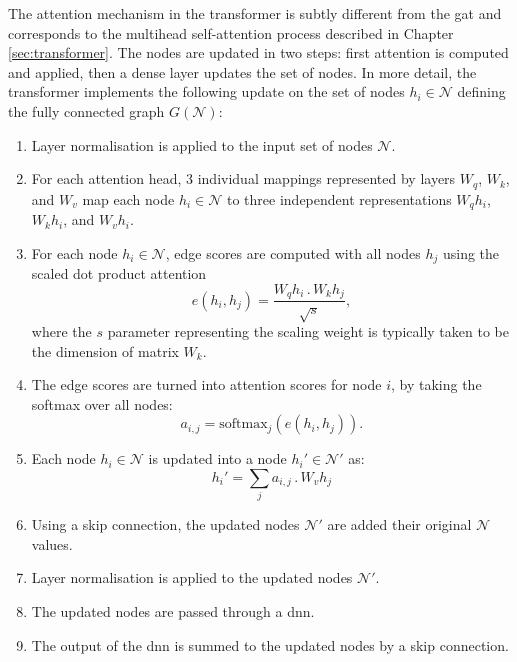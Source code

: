 The attention mechanism in the transformer is subtly different from the \gls{gat} and corresponds to the multihead self-attention process described in Chapter \ref{sec:transformer}. The nodes are updated in two steps: first attention is computed and applied, then a dense layer updates the set of nodes. In more detail, the transformer implements the following update on the set of nodes $h_i \in \mathcal{N}$ defining the fully connected graph $G(\mathcal{N})$:
\begin{enumerate}
  \item Layer normalisation is applied to the input set of nodes $\mathcal{N}$.
  \item For each attention head, 3 individual mappings represented by layers $W_q$, $W_k$, and $W_v$ map each node $h_i \in \mathcal{N}$ to three independent representations $W_qh_i$, $W_kh_i$, and $W_vh_i$.
  \item For each node $h_i \in \mathcal{N}$, edge scores are computed with all nodes $h_j$ using the scaled dot product attention \[e\left(h_i, h_j\right) = \frac{W_q h_i\, . \, W_k h_j}{\sqrt{s}},\] where the $s$ parameter representing the scaling weight is typically taken to be the dimension of matrix $W_k$. 
  \item The edge scores are turned into attention scores for node $i$, by taking the softmax over all nodes: \[a_{i, j} = \textrm{softmax}_j\left(e(h_i, h_j) \right).\]
  \item Each node $h_i \in \mathcal{N}$ is updated into a node $h_i' \in \mathcal{N}'$ as: \[h_i' = \sum_j a_{i, j} \,.\, W_v h_j\]
  \item Using a skip connection, the updated nodes $\mathcal{N}'$ are added their original $\mathcal{N}$ values. 
  \item Layer normalisation is applied to the updated nodes $\mathcal{N}'$.
  \item The updated nodes are passed through a \gls{dnn}.
  \item The output of the \gls{dnn} is summed to the updated nodes by a skip connection.
\end{enumerate}

